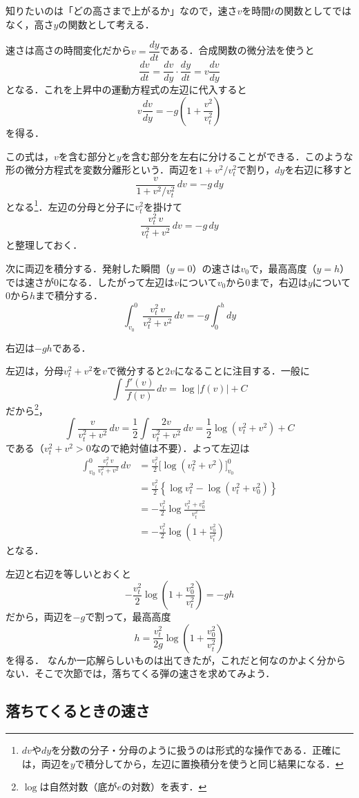 \documentclass[a4paper,12pt]{jarticle}
\theoremstyle{definition}%
\begin{document}
知りたいのは「どの高さまで上がるか」なので，速さ$v$を時間$t$の関数としてではなく，高さ$y$の関数として考える．

速さは高さの時間変化だから$v=\dfrac{dy}{dt}$である．合成関数の微分法を使うと
\[
\frac{dv}{dt}=\frac{dv}{dy}\cdot\frac{dy}{dt}=v\frac{dv}{dy}
\]
となる．これを上昇中の運動方程式の左辺に代入すると
\[
v\frac{dv}{dy}=-g\left(1+\frac{v^2}{v_t^2}\right)
\]
を得る．

この式は，$v$を含む部分と$y$を含む部分を左右に分けることができる．このような形の微分方程式を変数分離形という．両辺を$1+v^2/v_t^2$で割り，$dy$を右辺に移すと
\[
\frac{v}{1+v^2/v_t^2}\,dv=-g\,dy
\]
となる\footnote{$dv$や$dy$を分数の分子・分母のように扱うのは形式的な操作である．正確には，両辺を$y$で積分してから，左辺に置換積分を使うと同じ結果になる．}．左辺の分母と分子に$v_t^2$を掛けて
\[
\frac{v_t^2\,v}{v_t^2+v^2}\,dv=-g\,dy
\]
と整理しておく．

次に両辺を積分する．発射した瞬間（$y=0$）の速さは$v_0$で，最高高度（$y=h$）では速さが0になる．したがって左辺は$v$について$v_0$から$0$まで，右辺は$y$について$0$から$h$まで積分する．
\[
\int_{v_0}^{0}\frac{v_t^2\,v}{v_t^2+v^2}\,dv=-g\int_0^h dy
\]

右辺は$-gh$である．

左辺は，分母$v_t^2+v^2$を$v$で微分すると$2v$になることに注目する．一般に
\[
\int\frac{f'(v)}{f(v)}\,dv=\log|f(v)|+C
\]
だから\footnote{$\log$は自然対数（底が$e$の対数）を表す．}，
\[
\int\frac{v}{v_t^2+v^2}\,dv=\frac{1}{2}\int\frac{2v}{v_t^2+v^2}\,dv=\frac{1}{2}\log(v_t^2+v^2)+C
\]
である（$v_t^2+v^2>0$なので絶対値は不要）．よって左辺は
\begin{align*}
\int_{v_0}^{0}\frac{v_t^2\,v}{v_t^2+v^2}\,dv
&=\frac{v_t^2}{2}\Big[\log(v_t^2+v^2)\Big]_{v_0}^{0}\\
&=\frac{v_t^2}{2}\left\{\log v_t^2-\log(v_t^2+v_0^2)\right\}\\
&=-\frac{v_t^2}{2}\log\frac{v_t^2+v_0^2}{v_t^2}\\
&=-\frac{v_t^2}{2}\log\left(1+\frac{v_0^2}{v_t^2}\right)
\end{align*}
となる．

左辺と右辺を等しいとおくと
\[
-\frac{v_t^2}{2}\log\left(1+\frac{v_0^2}{v_t^2}\right)=-gh
\]
だから，両辺を$-g$で割って，最高高度
\[
h=\frac{v_t^2}{2g}\log\left(1+\frac{v_0^2}{v_t^2}\right)
\]
を得る．
なんか一応解らしいものは出てきたが，これだと何なのかよく分からない．そこで次節では，落ちてくる弾の速さを求めてみよう．


\subsection{落ちてくるときの速さ}
\end{document}
